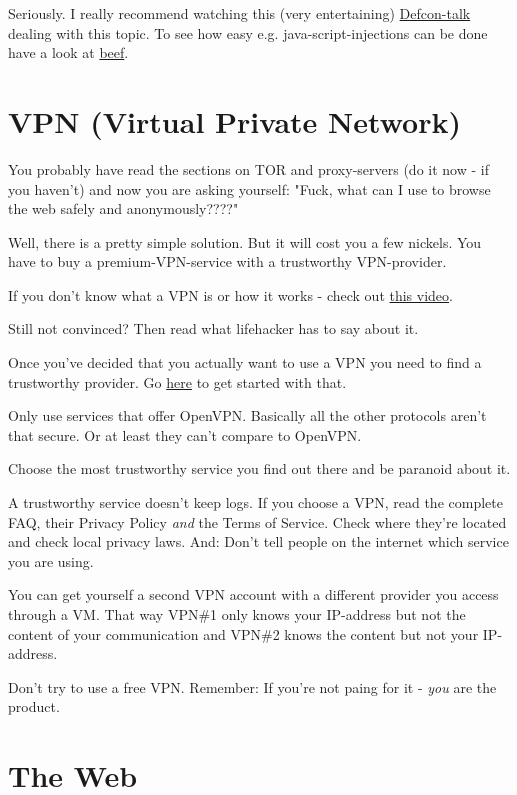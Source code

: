 \documentclass{article}
\begin{document}
 Seriously. I really recommend watching this (very entertaining) \href{http://youtu.be/kLt_uqSCEUA}{Defcon-talk} dealing with this topic. To see how easy e.g. java-script-injections can be done have a look at \href{ttp://beefproject.com/}{beef}.
\section{VPN (Virtual Private Network)}


 You probably have read the sections on TOR and proxy-servers (do it now - if you haven't) and now you are asking yourself: "Fuck, what can I use to browse the web safely and anonymously????" 


 Well, there is a pretty simple solution. But it will cost you a few nickels. You have to buy a premium-VPN-service with a trustworthy VPN-provider. 


 If you don't know what a VPN is or how it works - check out \href{http://youtu.be/JbvUhu3V0P8}{this video}. 


 Still not convinced? Then read what lifehacker has to say about it. 


 Once you've decided that you actually want to use a VPN you need to find a trustworthy provider. Go \href{https://torrentfreak.com/which-vpn-providers-really-take-anonymity-seriously-111007/}{here} to get started with that. 


 Only use services that offer OpenVPN. Basically all the other protocols aren't that secure. Or at least they can't compare to OpenVPN.


 Choose the most trustworthy service you find out there and be paranoid about it. 


 A trustworthy service doesn't keep logs. If you choose a VPN, read the complete FAQ, their Privacy Policy \emph{and} the Terms of Service. Check where they're located and check local privacy laws. And: Don't tell people on the internet which service you are using. 


 You can get yourself a second VPN account with a different provider you access through a VM. That way VPN\#1 only knows your IP-address but not the content of your communication and VPN\#2 knows the content but not your IP-address. 


 Don't try to use a free VPN. Remember: If you're not paing for it - \emph{you} are the product.
\section{The Web}
\end{document}
